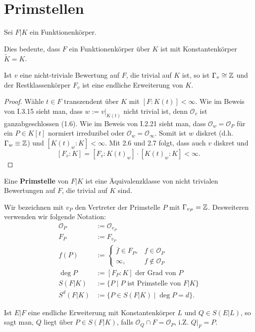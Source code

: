 \section{Primstellen}
Sei $F | K$ ein Funktionenkörper.

\begin{definition}
    Dies bedeute, dass $F$ ein Funktionenkörper über $K$ ist mit Konstantenkörper $\tilde{K}=K$.
\end{definition}

\begin{satz}
    Ist $v$ eine nicht-triviale Bewertung auf $F$, die trivial auf $K$ ist,
    so ist $\Gamma_v \cong \mathbb{Z}$ und der Restklassenkörper $F_v$ ist eine endliche Erweiterung von $K$.
\end{satz}
\begin{proof}
    Wähle $t \in F$ transzendent über $K$ mit $[F:K(t)] < \infty$.
    Wie im Beweis von I.3.15 sieht man, dass $w:= v|_{K(t)}$ nicht trivial ist, denn $\mathcal{O}_v$ ist ganzabgeschlossen (1.6).
    Wie im Beweis von I.2.21 sieht man, dass $\mathcal{O}_w = \mathcal{O}_P$ für ein 
    $P \in K[t]$ normiert irreduzibel oder $\mathcal{O}_w = \mathcal{O}_{\infty}$.
    Somit ist $w$ diskret (d.h. $\Gamma_w \equiv \mathbb{Z}$) und $[K(t)_w:K] < \infty$.
    Mit 2.6 und 2.7 folgt, dass auch $v$ diskret und $$ [F_v:K] = [F_v:K(t)_w]\cdot [K(t)_w:K] < \infty.$$
\end{proof}

\begin{definition}
    Eine \textbf{Primstelle} von $F|K$ ist eine Äquivalenzklasse von nicht trivialen Bewertungen auf $F$, die trivial auf $K$ sind.

    Wir bezeichnen mit $v_P$ den Vertreter der Primstelle $P$ mit $\Gamma_{v_P} = \mathbb{Z}$. 
    Desweiteren verwenden wir folgende Notation:
    \begin{align*}
        \mathcal{O}_P &:= \mathcal{O}_{v_P}\\
        F_P &:= F_{v_P}\\
        f(P) &:= \begin{cases}
            \overline{f} \in F_P, & f \in \mathcal{O}_P\\
            \infty, & f \notin \mathcal{O}_P
        \end{cases}\\
        \deg P &:= [F_P:K] \text{ der Grad von }P\\
        S(F|K) &:= \{P \mid P \text{ ist Primstelle von } F|K\}\\
        S^d(F|K) &:= \{P \in S(F|K) \mid \deg P = d\}.
    \end{align*}

    Ist $E|F$ eine endliche Erweiterung mit Konstantenkörper $L$ und $ Q \in S(E|L)$, so sagt man, $Q$ liegt über $P \in S(F|K)$, falls
    $\mathcal{O}_Q \cap F = \mathcal{O}_P$, i.Z. $Q|_F = P$.
\end{definition}


